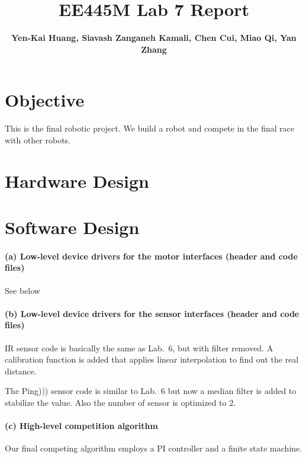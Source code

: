 \documentclass[a4paper]{article}
\begin{document}
\title{EE445M Lab 7 Report}
\author{\bfseries Yen-Kai Huang, Siavash Zanganeh Kamali, Chen Cui, Miao Qi, Yan Zhang}
\maketitle

\section{Objective} This is the final robotic project. We build a robot and compete in the final race with other robots.

\section{Hardware Design}

\section{Software Design}

\lstset{language=C, style=MyCStyle}

\paragraph{(a) Low-level device drivers for the motor interfaces (header and code files) \\}
{
See below


}

\paragraph{(b) Low-level device drivers for the sensor interfaces (header and code files) \\}
{
IR sensor code is basically the same as Lab.\ 6, but with filter removed. A calibration function is added
that applies linear interpolation to find out the real distance.




The Ping))) sensor code is similar to Lab.\ 6 but now a median filter is added to stabilize the value. Also
the number of sensor is optimized to 2.




}

\paragraph{(c) High-level competition algorithm \\}
{
Our final competing algorithm employs a PI controller and a finite state machine.


}
\end{document}
